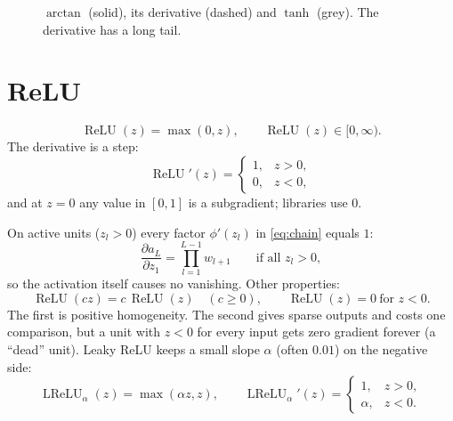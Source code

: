 \documentclass[11pt]{article}
\newcommand{\axes}[4]{%
  \draw[->] (#1,0) -- (#2,0) node[right] {$z$};
  \draw[->] (0,#3) -- (0,#4);
  \foreach \t in {-4,-2,2,4} \draw (\t,0.04) -- (\t,-0.04) node[below] {\scriptsize $\t$};
}
\begin{document}
\begin{figure}[H]
\centering
{}
\caption{$\arctan$ (solid), its derivative (dashed) and $\tanh$ (grey). The derivative has a long tail.}
\end{figure}

\section{ReLU}

\begin{equation}
  \operatorname{ReLU}(z)=\max(0,z), \qquad \operatorname{ReLU}(z)\in[0,\infty).
\end{equation}
The derivative is a step:
\begin{equation}
  \operatorname{ReLU}'(z)=
  \begin{cases}
    1, & z>0,\\
    0, & z<0,
  \end{cases}
\end{equation}
and at $z=0$ any value in $[0,1]$ is a subgradient; libraries use $0$.

On active units ($z_l>0$) every factor $\phi'(z_l)$ in \eqref{eq:chain} equals $1$:
\begin{equation}
  \frac{\partial a_L}{\partial z_1}=\prod_{l=1}^{L-1} w_{l+1}
  \qquad\text{if all } z_l>0,
\end{equation}
so the activation itself causes no vanishing. Other properties:
\begin{equation}
  \operatorname{ReLU}(cz)=c\,\operatorname{ReLU}(z)\quad (c\ge0),
  \qquad
  \operatorname{ReLU}(z)=0 \ \text{for } z<0 .
\end{equation}
The first is positive homogeneity. The second gives sparse outputs and costs one comparison,
but a unit with $z<0$ for every input gets zero gradient forever (a ``dead'' unit).
Leaky ReLU keeps a small slope $\alpha$ (often $0.01$) on the negative side:
\begin{equation}
  \operatorname{LReLU}_\alpha(z)=\max(\alpha z, z), \qquad
  \operatorname{LReLU}_\alpha'(z)=
  \begin{cases}
    1, & z>0,\\
    \alpha, & z<0.
  \end{cases}
\end{equation}
\end{document}

